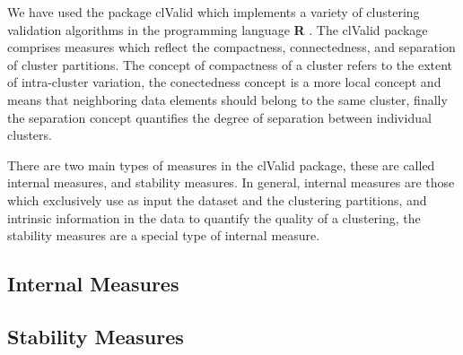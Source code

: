 We have  used the package clValid \cite{brock2008}  which implements a
variety  of  clustering   validation  algorithms  in the  programming
language  \textbf{R}  \cite{rcite}.   The  clValid  package  comprises
measures which reflect  the compactness, connectedness, and separation
of cluster partitions. The concept  of compactness of a cluster refers
to the extent of  intra-cluster variation, the conectedness concept is
a more local  concept and means that neighboring  data elements should
belong to the same  cluster, finally the separation concept quantifies
the degree of separation between individual clusters.

There are two main types of measures in the clValid package, these are
called internal measures, and stability measures. In general, internal
measures are those which exclusively  use as input the dataset and the
clustering  partitions,  and  intrinsic  information in  the  data  to
quantify the  quality of  a clustering, the  stability measures  are a
special type of internal measure.

\subsection{Internal Measures}

\subsection{Stability Measures}








